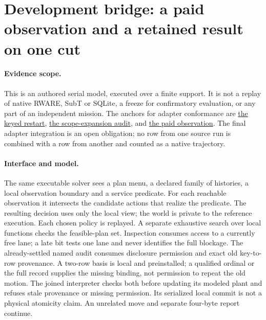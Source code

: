\documentclass{article}
\begin{document}
\section*{Development bridge: a paid observation and a retained result on one cut}

\paragraph{Evidence scope.}
This is an authored serial model, executed over a finite support.
It is not a replay of native RWARE, SubT or SQLite, a freeze for
confirmatory evaluation, or any part of an independent mission.
The anchors for adapter conformance are
\href{https://github.com/eternal-november/eos-research-programmes/pull/813}{the keyed restart},
\href{https://github.com/eternal-november/eos-research-programmes/pull/818}{the scope-expansion audit}, and
\href{https://github.com/eternal-november/eos-research-programmes/pull/825}{the paid observation}.
The final adapter integration is an open obligation; no row from
one source run is combined with a row from another and counted
as a native trajectory.

\paragraph{Interface and model.}
The same executable solver sees a plan menu, a declared family of
histories, a local observation boundary and a service predicate.
For each reachable observation it intersects the candidate actions
that realize the predicate. The resulting decision uses only the
local view; the world is private to the reference execution.
Each chosen policy is replayed. A separate exhaustive search
over local functions checks the feasible-plan set.
Inspection consumes access to a currently free lane; a late bit
tests one lane and never identifies the full blockage.
The already-settled named audit consumes disclosure permission
and exact old key-to-row provenance. A two-row basis is local and
preinstalled; a qualified ordinal or the full record supplies the
missing binding, not permission to repeat the old motion.
The joined interpreter checks both before updating its modeled plant
and refuses stale provenance or missing permission. Its serialized
local commit is not a physical atomicity claim.
An unrelated move and separate four-byte report continue.
\end{document}
